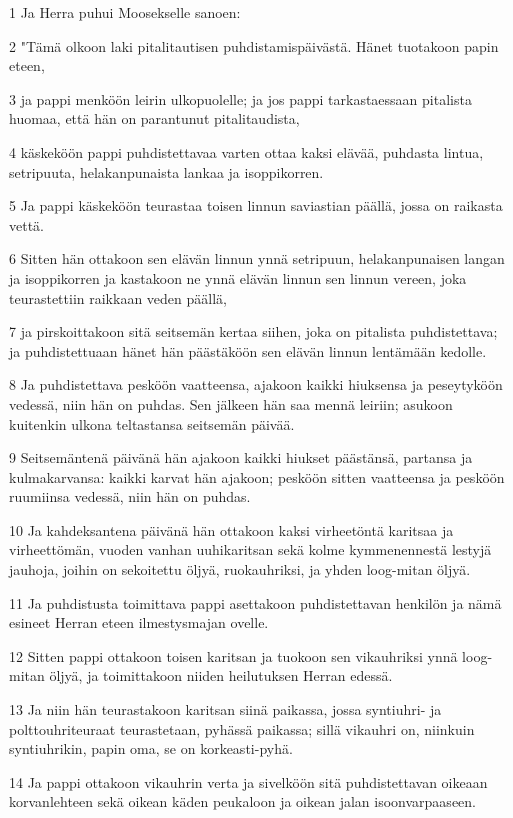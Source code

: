 \par 1 Ja Herra puhui Moosekselle sanoen:
\par 2 "Tämä olkoon laki pitalitautisen puhdistamispäivästä. Hänet tuotakoon papin eteen,
\par 3 ja pappi menköön leirin ulkopuolelle; ja jos pappi tarkastaessaan pitalista huomaa, että hän on parantunut pitalitaudista,
\par 4 käskeköön pappi puhdistettavaa varten ottaa kaksi elävää, puhdasta lintua, setripuuta, helakanpunaista lankaa ja isoppikorren.
\par 5 Ja pappi käskeköön teurastaa toisen linnun saviastian päällä, jossa on raikasta vettä.
\par 6 Sitten hän ottakoon sen elävän linnun ynnä setripuun, helakanpunaisen langan ja isoppikorren ja kastakoon ne ynnä elävän linnun sen linnun vereen, joka teurastettiin raikkaan veden päällä,
\par 7 ja pirskoittakoon sitä seitsemän kertaa siihen, joka on pitalista puhdistettava; ja puhdistettuaan hänet hän päästäköön sen elävän linnun lentämään kedolle.
\par 8 Ja puhdistettava pesköön vaatteensa, ajakoon kaikki hiuksensa ja peseytyköön vedessä, niin hän on puhdas. Sen jälkeen hän saa mennä leiriin; asukoon kuitenkin ulkona teltastansa seitsemän päivää.
\par 9 Seitsemäntenä päivänä hän ajakoon kaikki hiukset päästänsä, partansa ja kulmakarvansa: kaikki karvat hän ajakoon; pesköön sitten vaatteensa ja pesköön ruumiinsa vedessä, niin hän on puhdas.
\par 10 Ja kahdeksantena päivänä hän ottakoon kaksi virheetöntä karitsaa ja virheettömän, vuoden vanhan uuhikaritsan sekä kolme kymmenennestä lestyjä jauhoja, joihin on sekoitettu öljyä, ruokauhriksi, ja yhden loog-mitan öljyä.
\par 11 Ja puhdistusta toimittava pappi asettakoon puhdistettavan henkilön ja nämä esineet Herran eteen ilmestysmajan ovelle.
\par 12 Sitten pappi ottakoon toisen karitsan ja tuokoon sen vikauhriksi ynnä loog-mitan öljyä, ja toimittakoon niiden heilutuksen Herran edessä.
\par 13 Ja niin hän teurastakoon karitsan siinä paikassa, jossa syntiuhri- ja polttouhriteuraat teurastetaan, pyhässä paikassa; sillä vikauhri on, niinkuin syntiuhrikin, papin oma, se on korkeasti-pyhä.
\par 14 Ja pappi ottakoon vikauhrin verta ja sivelköön sitä puhdistettavan oikeaan korvanlehteen sekä oikean käden peukaloon ja oikean jalan isoonvarpaaseen.
